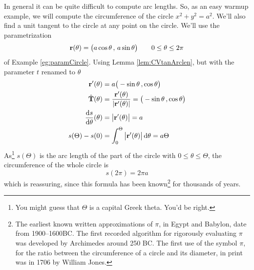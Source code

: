 \begin{eg}\label{eg:paramCircleTan}
In general it can be quite difficult to compute arc lengths.
So, as an easy warmup example, we will compute the circumference of the circle
$x^2+y^2=a^2$. We'll also find a unit tangent to the circle at any point on
the circle. We'll use the parametrization
\begin{equation*}
\mathbf{r}(\theta) = \big(a\cos\theta\,,\,a\sin\theta\big)\qquad
0\le \theta\le 2\pi
\end{equation*}
of Example \ref{eg:paramCircle}. Using Lemma \ref{lem:CVtanArclen},
but with the parameter $t$ renamed to $\theta$
\begin{align*}
\vr'(\theta) &= a\big(-\sin\theta\,,\cos\theta\big) \\
\hat\vT(\theta) &= \frac{\vr'(\theta)}{|\vr'(\theta)|}
               =  \big(-\sin\theta\,,\cos\theta\big) \\
\diff{s}{\theta}(\theta)&=\big|\vr'(\theta)\big| = a\\
s(\Theta)-s(0)&= \int_{0}^\Theta \big|\vr'(\theta)\big|\,\dee{\theta}
          =a\Theta
\end{align*}
As\footnote{You might guess that $\Theta$ is a capital Greek theta. You'd be right.} $s(\Theta)$ is the arc length of the part of the circle with 
$0\le\theta\le\Theta$, the circumference of the whole circle is
\begin{equation*}
s(2\pi) = 2\pi a
\end{equation*} 
which is reassuring, since this formula has been known\footnote{The earliest known written approximations of $\pi$, in Egypt and Babylon, date 
from 1900--1600BC. The first recorded algorithm for rigorously evaluating $\pi$
was developed by Archimedes around 250 BC. The first use of the symbol $\pi$,
for the ratio between the circumference of a circle and its diameter,
in print was in 1706 by William Jones.}
for thousands of years.%
\end{eg}
